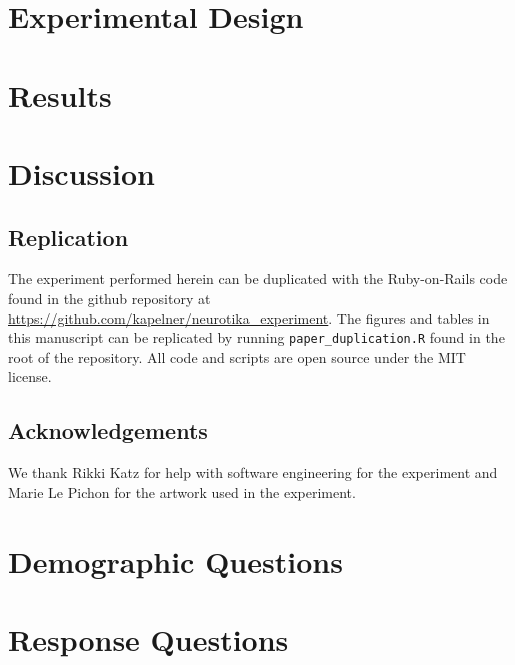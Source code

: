 \documentclass[12pt]{article}
\begin{document}
\section{Experimental Design}\label{sec:design}

\section{Results}\label{sec:results}

\section{Discussion}\label{sec:discussion}

\subsection*{Replication}

The experiment performed herein can be duplicated with the Ruby-on-Rails code found in the github repository at \url{https://github.com/kapelner/neurotika_experiment}. The figures and tables in this manuscript can be replicated by running \texttt{paper\_duplication.R} found in the root of the repository. All code and scripts are open source under the MIT license.

\subsection*{Acknowledgements}

We thank Rikki Katz for help with software engineering for the experiment and Marie Le Pichon for the artwork used in the experiment.




\appendix
\section{Demographic Questions}\label{app:demo_questions}
\section{Response Questions}\label{app:response_questions}
\end{document}
